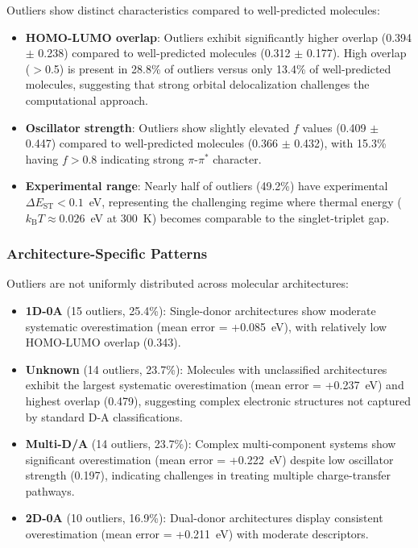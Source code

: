 Outliers show distinct characteristics compared to well-predicted molecules:

\begin{itemize}
    \item \textbf{HOMO-LUMO overlap}: Outliers exhibit significantly higher overlap (0.394 $\pm$ 0.238) compared to well-predicted molecules (0.312 $\pm$ 
0.177). High overlap ($>$0.5) is present in 28.8\% of outliers versus only 13.4\% of well-predicted molecules, suggesting that strong orbital delocalization 
challenges the computational approach.
    
    \item \textbf{Oscillator strength}: Outliers show slightly elevated $f$ values (0.409 $\pm$ 0.447) compared to well-predicted molecules (0.366 $\pm$ 0.432), 
with 15.3\% having $f > 0.8$ indicating strong $\pi$-$\pi^*$ character.
    
    \item \textbf{Experimental range}: Nearly half of outliers (49.2\%) have experimental $\Delta E_{\mathrm{ST}} < 0.1$~eV, representing the challenging regime 
where thermal energy ($k_{\mathrm{B}}T \approx 0.026$~eV at 300~K) becomes comparable to the singlet-triplet gap.
\end{itemize}

\subsubsection{Architecture-Specific Patterns}

Outliers are not uniformly distributed across molecular architectures:

\begin{itemize}
    \item \textbf{1D-0A} (15 outliers, 25.4\%): Single-donor architectures show moderate systematic overestimation (mean error = +0.085~eV), with relatively low 
HOMO-LUMO overlap (0.343).
    
    \item \textbf{Unknown} (14 outliers, 23.7\%): Molecules with unclassified architectures exhibit the largest systematic overestimation (mean error = 
+0.237~eV) and highest overlap (0.479), suggesting complex electronic structures not captured by standard D-A classifications.
    
    \item \textbf{Multi-D/A} (14 outliers, 23.7\%): Complex multi-component systems show significant overestimation (mean error = +0.222~eV) despite low 
oscillator strength (0.197), indicating challenges in treating multiple charge-transfer pathways.
    
    \item \textbf{2D-0A} (10 outliers, 16.9\%): Dual-donor architectures display consistent overestimation (mean error = +0.211~eV) with moderate descriptors.
\end{itemize}

